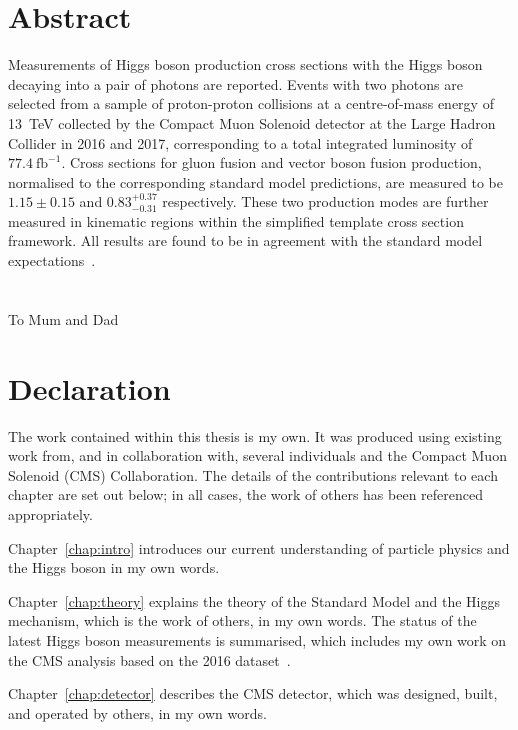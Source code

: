 \chapter*{\centering Abstract}
Measurements of Higgs boson production cross sections 
with the Higgs boson decaying into a pair of photons are reported.
Events with two photons are selected from a sample of proton-proton collisions 
at a centre-of-mass energy of \SI{13}{TeV} 
collected by the Compact Muon Solenoid detector at the Large Hadron Collider in 2016 and 2017,
corresponding to a total integrated luminosity of $77.4~\mathrm{fb}^{-1}$.
Cross sections for gluon fusion and vector boson fusion production, 
normalised to the corresponding standard model predictions,
are measured to be $1.15 \pm 0.15$ and $0.83_{-0.31}^{+0.37}$ respectively.
These two production modes are further measured in kinematic regions 
within the simplified template cross section framework.
All results are found to be in agreement with the standard model expectations~\cite{HIG-18-029}.


\chapter*{\centering }%
\begin{center}
    \thispagestyle{empty}
    To Mum and Dad
\end{center}


\chapter*{\centering Declaration}
The work contained within this thesis is my own. 
It was produced using existing work from, and in collaboration with, 
several individuals and the Compact Muon Solenoid (CMS) Collaboration. 
The details of the contributions relevant to each chapter are set out below;
in all cases, the work of others has been referenced appropriately.

Chapter~\ref{chap:intro} introduces our current understanding of particle physics 
and the Higgs boson in my own words.

Chapter~\ref{chap:theory} explains the theory of the Standard Model and the Higgs mechanism, 
which is the work of others, in my own words. 
The status of the latest Higgs boson measurements is summarised, 
which includes my own work on the CMS \Hgg analysis based on the 2016 dataset~\cite{HIG-16-040}.

Chapter~\ref{chap:detector} describes the CMS detector, 
which was designed, built, and operated by others, in my own words.

